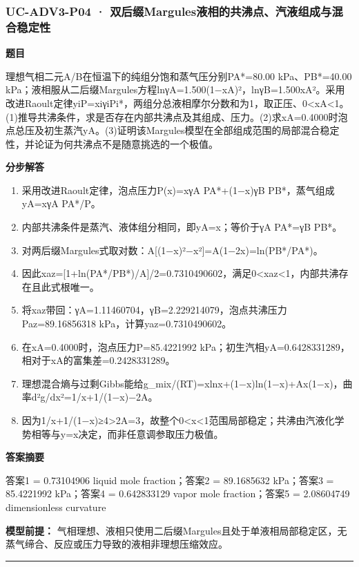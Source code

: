 \documentclass[UTF8,11pt,a4paper]{ctexart}
\begin{document}
\subsubsection*{UC-ADV3-P04 · 双后缀Margules液相的共沸点、汽液组成与混合稳定性}
\noindent\textbf{题目}\par
理想气相二元A/B在恒温下的纯组分饱和蒸气压分别PA*=80.00 kPa、PB*=40.00 kPa；液相服从二后缀Margules方程lnγA=1.500(1−xA)²，lnγB=1.500xA²。采用改进Raoult定律yiP=xiγiPi*，两组分总液相摩尔分数和为1，取正压、0<xA<1。(1)推导共沸条件，求是否存在内部共沸点及其组成、压力。(2)求xA=0.4000时泡点总压及初生蒸汽yA。(3)证明该Margules模型在全部组成范围的局部混合稳定性，并论证为何共沸点不是随意挑选的一个极值。\par
\medskip\noindent\textbf{分步解答}
\begin{enumerate}
\item 采用改进Raoult定律，泡点压力P(x)=xγA PA*+(1−x)γB PB*，蒸气组成yA=xγA PA*/P。
\item 内部共沸条件是蒸汽、液体组分相同，即yA=x；等价于γA PA*=γB PB*。
\item 对两后缀Margules式取对数：A[(1−x)²−x²]=A(1−2x)=ln(PB*/PA*)。
\item 因此xaz=[1+ln(PA*/PB*)/A]/2=0.7310490602，满足0<xaz<1，内部共沸存在且此式根唯一。
\item 将xaz带回：γA=1.11460704，γB=2.229214079，泡点共沸压力Paz=89.16856318 kPa，计算yaz=0.7310490602。
\item 在xA=0.4000时，泡点压力P=85.4221992 kPa；初生汽相yA=0.6428331289，相对于xA的富集差=0.2428331289。
\item 理想混合熵与过剩Gibbs能给g\_mix/(RT)=xlnx+(1−x)ln(1−x)+Ax(1−x)，曲率d²g/dx²=1/x+1/(1−x)−2A。
\item 因为1/x+1/(1−x)≥4>2A=3，故整个0<x<1范围局部稳定；共沸由汽液化学势相等与y=x决定，而非任意调参取压力极值。
\end{enumerate}
\noindent\textbf{答案摘要}\par
答案1 = 0.73104906 liquid mole fraction；答案2 = 89.1685632 kPa；答案3 = 85.4221992 kPa；答案4 = 0.642833129 vapor mole fraction；答案5 = 2.08604749 dimensionless curvature\par
\noindent\textbf{模型前提：}
气相理想、液相只使用二后缀Margules且处于单液相局部稳定区，无蒸气缔合、反应或压力导致的液相非理想压缩效应。\par
\medskip\hrule\medskip
{}
\end{document}
